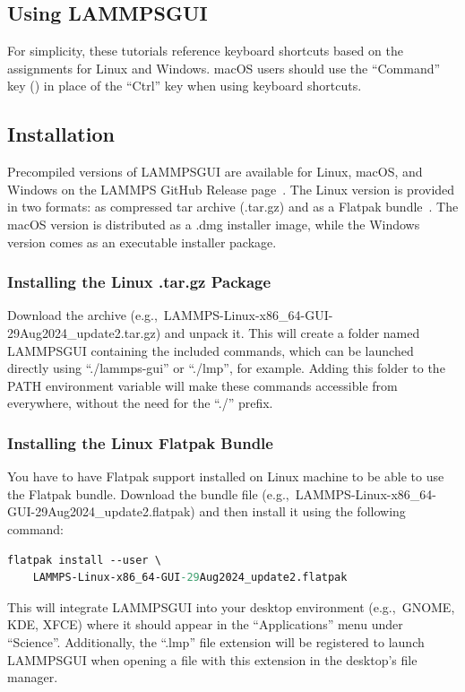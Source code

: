 \documentclass[9pt,tutorial]{livecoms}
\newcommand{\lammpsgui}{\textsf{LAMMPS\textendash GUI}}
\begin{document}
\begin{appendices}
\section{Using \lammpsgui{}}
\label{using-lammps-gui-label}

\begin{note}
For simplicity, these tutorials reference keyboard shortcuts
based on the assignments for Linux and Windows.  {macOS} users should
use the ``Command'' key (\cmd) in place of the
``Ctrl'' key when using keyboard shortcuts.
\end{note}

\subsection{Installation}

Precompiled versions of \lammpsgui{} are available for Linux, {macOS},
and Windows on the LAMMPS GitHub Release
page~\cite{lammps_github_release}.  The Linux version is provided in two
formats: as compressed tar archive (.tar.gz) and as a Flatpak
bundle~\cite{flatpak_home}.  The {macOS} version is distributed as a
.dmg installer image, while the Windows version comes as an executable
installer package.

\subsubsection{Installing the Linux .tar.gz Package}

Download the archive (e.g.,~LAMMPS-Linux-x86\_64-GUI-29Aug2024\_update2.tar.gz)
and unpack it.  This will create a folder named \lammpsgui{} containing the
included commands, which can be launched directly using ``./lammps-gui'' or
``./lmp'', for example.  Adding this folder to the PATH environment
variable will make these commands accessible from everywhere, without the
need for the ``./'' prefix.

\subsubsection{Installing the Linux Flatpak Bundle}

You have to have Flatpak support installed on Linux machine to be able
to use the Flatpak bundle.  Download the bundle file
(e.g.,~LAMMPS-Linux-x86\_64-GUI-29Aug2024\_update2.flatpak) and then
install it using the following command:
\begin{lstlisting}[language=tcl]
flatpak install --user \
    LAMMPS-Linux-x86_64-GUI-29Aug2024_update2.flatpak
\end{lstlisting}
This will integrate \lammpsgui{} into your desktop environment
(e.g.,~GNOME, KDE, XFCE) where it should appear in the ``Applications''
menu under ``Science''.  Additionally, the ``.lmp'' file extension will be
registered to launch \lammpsgui{} when opening a file with this
extension in the desktop's file manager.


\end{appendices}
\end{document}
